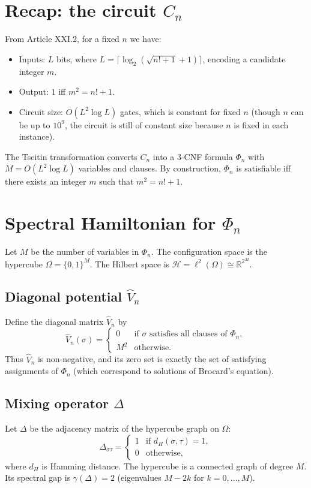 \documentclass[11pt,a4paper]{article}
\begin{document}
\section{Recap: the circuit $C_n$}

From Article XXI.2, for a fixed $n$ we have:
\begin{itemize}
\item Inputs: $L$ bits, where $L = \lceil \log_2(\sqrt{n!+1}+1)\rceil$, encoding a candidate integer $m$.
\item Output: $1$ iff $m^2 = n!+1$.
\item Circuit size: $O(L^2 \log L)$ gates, which is constant for fixed $n$ (though $n$ can be up to $10^9$, the circuit is still of constant size because $n$ is fixed in each instance).
\end{itemize}

The Tseitin transformation converts $C_n$ into a 3‑CNF formula $\Phi_n$ with $M = O(L^2 \log L)$ variables and clauses. By construction, $\Phi_n$ is satisfiable iff there exists an integer $m$ such that $m^2 = n!+1$.

\section{Spectral Hamiltonian for $\Phi_n$}

Let $M$ be the number of variables in $\Phi_n$. The configuration space is the hypercube $\Omega = \{0,1\}^M$. The Hilbert space is $\mathcal{H} = \ell^2(\Omega) \cong \mathbb{R}^{2^M}$.

\subsection{Diagonal potential $\hat{V}_n$}
Define the diagonal matrix $\hat{V}_n$ by
\[
\hat{V}_n(\sigma) = \begin{cases}
0 & \text{if }\sigma\text{ satisfies all clauses of } \Phi_n,\\
M^2 & \text{otherwise}.
\end{cases}
\]
Thus $\hat{V}_n$ is non‑negative, and its zero set is exactly the set of satisfying assignments of $\Phi_n$ (which correspond to solutions of Brocard's equation).

\subsection{Mixing operator $\Delta$}
Let $\Delta$ be the adjacency matrix of the hypercube graph on $\Omega$:
\[
\Delta_{\sigma\tau} = \begin{cases}
1 & \text{if } d_H(\sigma,\tau)=1,\\
0 & \text{otherwise},
\end{cases}
\]
where $d_H$ is Hamming distance. The hypercube is a connected graph of degree $M$. Its spectral gap is $\gamma(\Delta)=2$ (eigenvalues $M-2k$ for $k=0,\dots,M$).
\end{document}
